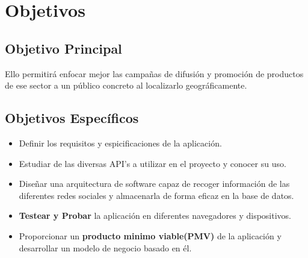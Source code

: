 \chapter{Objetivos}


\section{Objetivo Principal}


Ello permitirá enfocar mejor las campañas de difusión y promoción de productos de ese sector a un público concreto al localizarlo geográficamente.

\vspace{5 mm}

\section{Objetivos Específicos}

\begin{itemize}
  \item Definir los requisitos y espicificaciones de la aplicación.
  \item Estudiar de las diversas API's a utilizar en el proyecto y conocer su uso.
  \item Diseñar una arquitectura de software capaz de recoger información de las diferentes redes sociales y almacenarla de forma eficaz en la base de datos.
  \item \textbf{Testear y Probar} la aplicación en diferentes navegadores y dispositivos.
  \item Proporcionar un \textbf{producto minimo viable(PMV)} de la aplicación y desarrollar un modelo de negocio basado en él.
\end{itemize}


